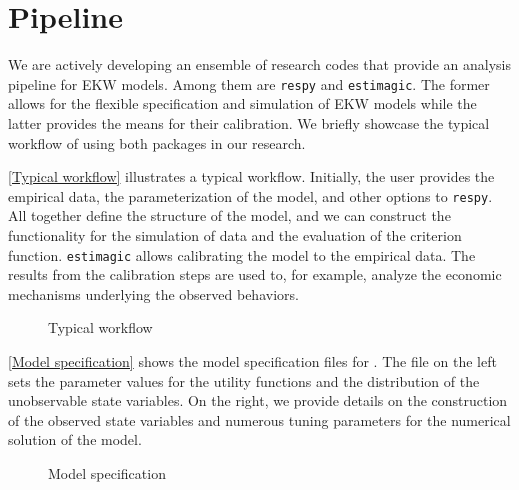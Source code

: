 \section{Pipeline}
We are actively developing an ensemble of research codes that provide an analysis pipeline for EKW models. Among them are \verb+respy+ and \verb+estimagic+. The former allows for the flexible specification and simulation of EKW models while the latter provides the means for their calibration. We briefly showcase the typical workflow of using both packages in our research.

\autoref{Typical workflow} illustrates a typical workflow. Initially, the user provides the empirical data, the parameterization of the model, and other options to \verb+respy+. All together define the structure of the model, and we can construct the functionality for the simulation of data and the evaluation of the criterion function. \verb+estimagic+ allows calibrating the model to the empirical data. The results from the calibration steps are used to, for example, analyze the economic mechanisms underlying the observed behaviors.

\begin{figure}[t!]\centering
	
	\caption{Typical workflow}\label{Typical workflow}
\end{figure}%

\autoref{Model specification} shows the model specification files for \citet{Keane.1997}. The file on the left sets the parameter values for the utility functions and the distribution of the unobservable state variables. On the right, we provide details on the construction of the observed state variables and numerous tuning parameters for the numerical solution of the model.

\begin{figure}[t!]\centering
	\hspace{0.3cm}
	\caption{Model specification}\label{Model specification}
\end{figure}%

